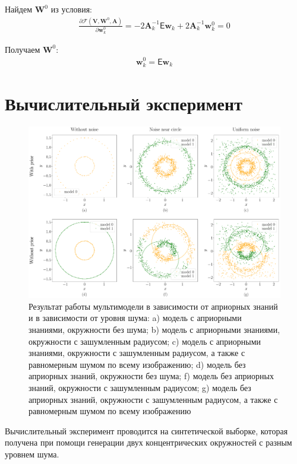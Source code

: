 \documentclass[12pt, twoside]{article}
\numberwithin{equation}{section}
\begin{document}
Найдем $\textbf{W}^{0}$ из условия:
\begin{equation}
\label{eq:st:lin:10}
\begin{aligned}
\frac{\partial \mathcal{F}\left(\textbf{V}, \textbf{W}^{0}, \textbf{A}\right)}{\partial \textbf{w}_{k}^{0}} = -2\textbf{A}_{k}^{-1}\mathsf{E}\textbf{w}_{k} + 2\textbf{A}_{k}^{-1}\textbf{w}_{k}^{0}=0
\end{aligned}
\end{equation}

Получаем $\textbf{W}^{0}$:
\begin{equation}
\label{eq:st:lin:11}
\begin{aligned}
\textbf{w}_{k}^{0} = \mathsf{E}\textbf{w}_{k}
\end{aligned}
\end{equation}

\section{Вычислительный эксперимент}
\begin{figure}[h!t]\center
\includegraphics[width=1\textwidth]{results/experiment_synthetic}
\caption{Результат работы мультимодели в зависимости от априорных знаний и в зависимости от уровня шума: a) модель с априорными знаниями, окружности без шума; b) модель с априорными знаниями, окружности с зашумленным радиусом; c) модель с априорными знаниями, окружности с зашумленным радиусом, а также с равномерным шумом по всему изображению; d) модель без априорных знаний, окружности без шума; f) модель без априорных знаний, окружности с зашумленным радиусом; g) модель без априорных знаний, окружности с зашумленным радиусом, а также с равномерным шумом по всему изображению}
\label{experiment:1}
\end{figure}
Вычислительный эксперимент проводится на синтетической выборке, которая получена при помощи генерации двух концентрических окружностей с разным уровнем шума.
\end{document}

